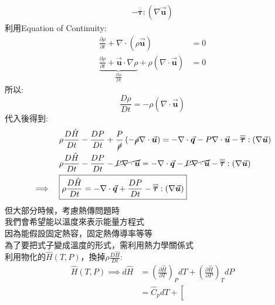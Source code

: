 \documentclass[../main.tex]{subfiles}
\begin{document}
\begin{itemize}
\begin{itemize}
\begin{align}
           - \overline{\overline{\bm \tau}} : \left(\nabla \vec{\bm u}\right)
        \end{align}
        利用Equation of Continuity: 
        \begin{align}
          \frac{\partial \rho}{\partial t} + \nabla \cdot( \rho \vec{\bm u}) &= 0\nonumber\\
          \underbrace{\frac{\partial \rho}{\partial t} + \vec{\bm u} \cdot \nabla \rho}_{\frac{D \rho}{Dt}} 
          + \rho \left(\nabla \cdot \vec{\bm u}\right) &= 0
        \end{align}
        所以:
        \begin{equation}
          \frac{D \rho}{Dt} = - \rho \left(\nabla \cdot \vec{\bm u}\right)
        \end{equation}
        代入後得到:
        \begin{align}
          & \rho\frac{D\hat H}{Dt} - \frac{D P}{Dt} 
          + \frac{P}{\cancel{\rho}}\left(-\cancel{\rho} \nabla \cdot \vec{\bm u}\right) = 
          -\nabla \cdot \vec{\bm q} 
          - P \nabla \cdot \vec{\bm u}
          - \overline{\overline{\bm \tau}} : \left(\nabla \vec{\bm u}\right) \nonumber\\
          & \rho\frac{D\hat H}{Dt} - \frac{D P}{Dt} 
          -\cancel{ P \nabla \cdot \vec{\bm u}} = 
          -\nabla \cdot \vec{\bm q} 
          -\cancel{ P \nabla \cdot \vec{\bm u}}
          - \overline{\overline{\bm \tau}} : \left(\nabla \vec{\bm u}\right) \nonumber\\
          \implies \quad &\boxed{\rho \frac{D\hat H}{Dt} = -\nabla \cdot \vec{\bm q} + \frac{D P}{Dt} 
          - \overline{\overline{\bm \tau}} : \left(\nabla \vec{\bm u}\right)} \label{eq:energy_equation_intermediate}
        \end{align}
        但大部分時候，考慮熱傳問題時\\
        我們會希望能以溫度來表示能量方程式\\
        因為能假設固定熱容，固定熱傳導率等等\\
        為了要把式子變成溫度的形式，需利用熱力學關係式\\
        利用物化的$\hat H(T,P)$，換掉$\rho \frac{D\hat H}{Dt}$:
        \begin{align}
          \hat H(T,P) \implies d\hat H &= \left(
            \frac{\partial \hat H}{\partial T}
          \right)_P dT + \left(
            \frac{\partial \hat H}{\partial P}
          \right)_T dP \nonumber\\
          &= \hat C_p dT + \left[

\end{align}
\end{itemize}
\end{itemize}
\end{document}

